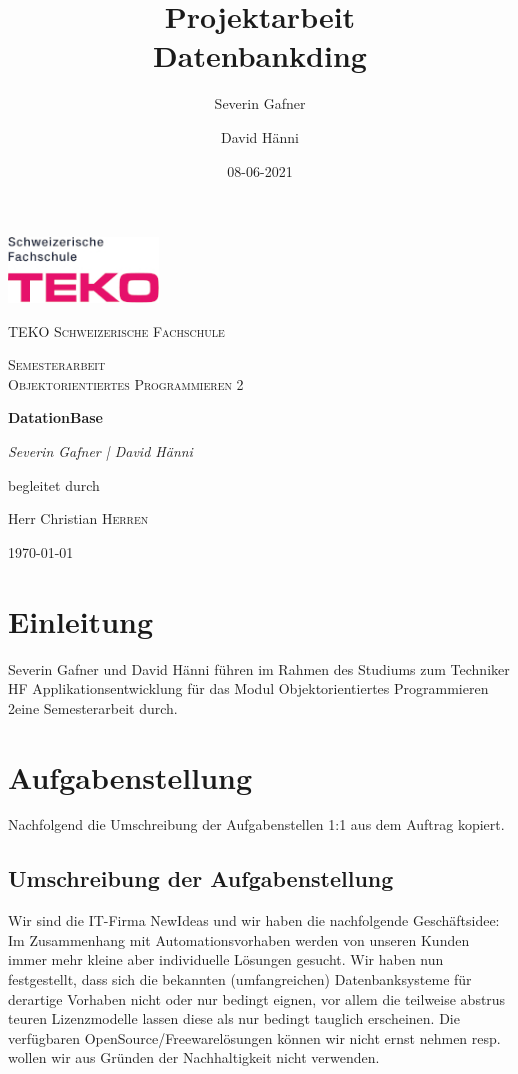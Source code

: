 \documentclass{article}
\title{Projektarbeit \\ Datenbankding}
\date{08-06-2021}
\author{Severin Gafner \and David Hänni}
\def\Cmodule{Objektorientiertes Programmieren 2}
\def\Ctitle{DatationBase}
\def\Cauthor{Severin Gafner | David Hänni}
\def\Cschool{TEKO Schweizerische Fachschule}
\begin{document}
\begin{titlepage}
	\centering
	\includegraphics[width=0.3\textwidth]{images/teko-logo-pink.jpg}\par\vspace{1cm}
	{\scshape\LARGE \Cschool\par}
	\vspace{1cm}
	{\scshape\Large Semesterarbeit \\ \Cmodule\par}
	\vspace{1.5cm}
	{\huge\bfseries \Ctitle\par}
	\vspace{2cm}
	{\Large\itshape \Cauthor\par}
	\vfill
	begleitet durch\par
	Herr Christian \textsc{Herren}

	\vfill

	{\large \germanformat\today\par}
\end{titlepage}
\newpage
{}

\section{Einleitung}

Severin Gafner und David Hänni führen im Rahmen des Studiums zum Techniker HF Applikationsentwicklung für das Modul \Cmodule eine Semesterarbeit durch. 

\section{Aufgabenstellung}
Nachfolgend die Umschreibung der Aufgabenstellen 1:1 aus dem Auftrag kopiert.
\subsection{Umschreibung der Aufgabenstellung}
Wir sind die IT-Firma NewIdeas und wir haben die nachfolgende Geschäftsidee: 
Im Zusammenhang mit Automationsvorhaben werden von unseren Kunden immer mehr kleine aber individuelle Lösungen gesucht. 
Wir haben nun festgestellt, dass sich die bekannten (umfangreichen) Datenbanksysteme für derartige Vorhaben nicht oder nur bedingt eignen, vor allem die teilweise abstrus teuren Lizenzmodelle lassen diese als nur bedingt tauglich erscheinen. 
Die verfügbaren OpenSource/Freewarelösungen können wir nicht ernst nehmen resp. wollen wir aus Gründen der Nachhaltigkeit nicht verwenden.
\end{document}
